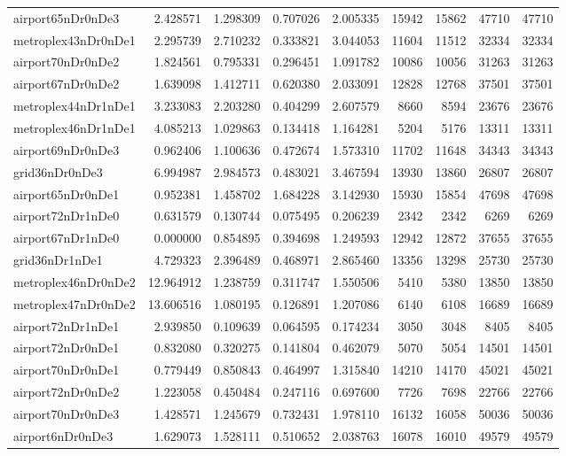 \begin{longtable}{|l|r|r|r|r|r|r|r|r|}
airport65nDr0nDe3 & 2.428571 & 1.298309 & 0.707026 & 2.005335 & 15942 & 15862 & 47710 & 47710 \\
metroplex43nDr0nDe1 & 2.295739 & 2.710232 & 0.333821 & 3.044053 & 11604 & 11512 & 32334 & 32334 \\
airport70nDr0nDe2 & 1.824561 & 0.795331 & 0.296451 & 1.091782 & 10086 & 10056 & 31263 & 31263 \\
airport67nDr0nDe2 & 1.639098 & 1.412711 & 0.620380 & 2.033091 & 12828 & 12768 & 37501 & 37501 \\
metroplex44nDr1nDe1 & 3.233083 & 2.203280 & 0.404299 & 2.607579 & 8660 & 8594 & 23676 & 23676 \\
metroplex46nDr1nDe1 & 4.085213 & 1.029863 & 0.134418 & 1.164281 & 5204 & 5176 & 13311 & 13311 \\
airport69nDr0nDe3 & 0.962406 & 1.100636 & 0.472674 & 1.573310 & 11702 & 11648 & 34343 & 34343 \\
grid36nDr0nDe3 & 6.994987 & 2.984573 & 0.483021 & 3.467594 & 13930 & 13860 & 26807 & 26807 \\
airport65nDr0nDe1 & 0.952381 & 1.458702 & 1.684228 & 3.142930 & 15930 & 15854 & 47698 & 47698 \\
airport72nDr1nDe0 & 0.631579 & 0.130744 & 0.075495 & 0.206239 & 2342 & 2342 & 6269 & 6269 \\
airport67nDr1nDe0 & 0.000000 & 0.854895 & 0.394698 & 1.249593 & 12942 & 12872 & 37655 & 37655 \\
grid36nDr1nDe1 & 4.729323 & 2.396489 & 0.468971 & 2.865460 & 13356 & 13298 & 25730 & 25730 \\
metroplex46nDr0nDe2 & 12.964912 & 1.238759 & 0.311747 & 1.550506 & 5410 & 5380 & 13850 & 13850 \\
metroplex47nDr0nDe2 & 13.606516 & 1.080195 & 0.126891 & 1.207086 & 6140 & 6108 & 16689 & 16689 \\
airport72nDr1nDe1 & 2.939850 & 0.109639 & 0.064595 & 0.174234 & 3050 & 3048 & 8405 & 8405 \\
airport72nDr0nDe1 & 0.832080 & 0.320275 & 0.141804 & 0.462079 & 5070 & 5054 & 14501 & 14501 \\
airport70nDr0nDe1 & 0.779449 & 0.850843 & 0.464997 & 1.315840 & 14210 & 14170 & 45021 & 45021 \\
airport72nDr0nDe2 & 1.223058 & 0.450484 & 0.247116 & 0.697600 & 7726 & 7698 & 22766 & 22766 \\
airport70nDr0nDe3 & 1.428571 & 1.245679 & 0.732431 & 1.978110 & 16132 & 16058 & 50036 & 50036 \\
airport6nDr0nDe3 & 1.629073 & 1.528111 & 0.510652 & 2.038763 & 16078 & 16010 & 49579 & 49579 \\

\end{longtable}
